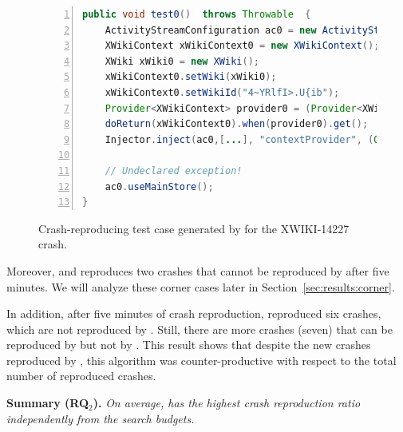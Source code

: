     
\begin{figure}[t]
    \begin{lstlisting}[numbers=left,
            firstnumber=1,
            language=Java,
            basicstyle=\footnotesize]
public void test0()  throws Throwable  {
    ActivityStreamConfiguration ac0 = new ActivityStreamConfiguration();
    XWikiContext xWikiContext0 = new XWikiContext();
    XWiki xWiki0 = new XWiki();
    xWikiContext0.setWiki(xWiki0);
    xWikiContext0.setWikiId("4~YRlfI>.U{ib");
    Provider<XWikiContext> provider0 = (Provider<XWikiContext>) mock([...]);
    doReturn(xWikiContext0).when(provider0).get();
    Injector.inject(ac0,[...], "contextProvider", (Object) provider0);
                    
    // Undeclared exception!
    ac0.useMainStore();
}
    \end{lstlisting}
    \caption{Crash-reproducing test case generated by \moho for the XWIKI-14227 crash.}
    \label{lst:generatedtest}
\end{figure}
    

Moreover, \SGGA and \decomposition reproduces two crashes that cannot be reproduced by \moho after five minutes. We will analyze these corner cases later in Section~\ref{sec:results:corner}.

In addition, after five minutes of crash reproduction, \decomposition reproduced six crashes, which are not reproduced by \SGGA. Still, there are more crashes (seven) that can be reproduced by \SGGA but not by \decomposition. This result shows that despite the new crashes reproduced by \decomposition, this algorithm was counter-productive with respect to the total number of reproduced crashes. 

 
\textbf{Summary (RQ$_2$). }
\textit{On average, \moho has the highest crash reproduction ratio independently from the search budgets. %
}

